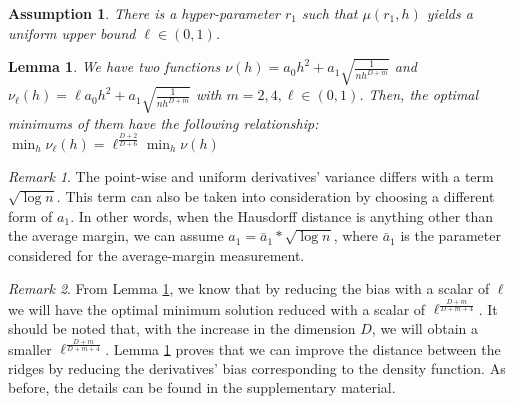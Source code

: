 \documentclass[aos,preprint]{imsart}
\newtheorem{lemma}[theorem]{Lemma}
\newtheorem{assumption}[theorem]{Assumption}
\theoremstyle{remark}
\newtheorem*{remark}{Remark}
\begin{document}
\begin{assumption}\label{assum}
There is a hyper-parameter $r_1$ such that $\mu(r_1,h)$ yields a uniform upper bound $\ell\in(0,1)$.
\end{assumption}
\begin{lemma}\label{improve_lemma}
We have two functions $\nu(h) = a_0 h^2 + a_1 \sqrt{\frac{1}{nh^{D+m}}}$ and $\nu_\ell (h) = \ell a_0 h^2 + a_1 \sqrt{\frac{1}{nh^{D+m}}}$ with $m=2,4,\ell \in(0,1)$. Then, the optimal minimums of them have the following relationship:  $\min_h \nu_\ell (h) = \ell^{\frac{D+2}{D+6}}\min_h \nu(h)$
\end{lemma} 
\begin{remark}
The point-wise and uniform derivatives' variance differs with a term $\sqrt{\log n}$. This term can also be taken into consideration by choosing a different form of $a_1$. In other words, when the Hausdorff distance is anything other than the average margin, we can assume $a_1=\bar{a}_1*\sqrt{\log n}$, where $\bar{a}_1$ is the parameter considered for the average-margin measurement.
\end{remark}
\begin{remark}
From Lemma \ref{improve_lemma}, we know that by reducing the bias with a scalar of $\ell$ we will have the optimal minimum solution reduced with a scalar of $\ell^{\frac{D+m}{D+m+4}}$. It should be noted that, with the increase in the dimension $D$, we will obtain a smaller $\ell^{\frac{D+m}{D+m+4}}$. Lemma \ref{improve_lemma} proves that we can improve the distance between the ridges by reducing the derivatives' bias corresponding to the density function. As before, the details can be found in the supplementary material.%
\end{remark}
\end{document}
